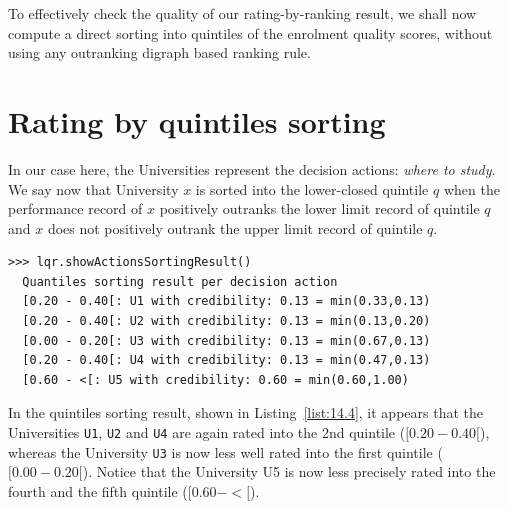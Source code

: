To effectively check the quality of our \NetFlows rating-by-ranking result, we shall now compute a direct sorting into quintiles of the enrolment quality scores, without using any outranking digraph based ranking rule.

\section{Rating by quintiles sorting}
\label{sec:14.4}

In our case here, the Universities represent the decision actions: \emph{where to study}. We say now that University $x$ is sorted into the lower-closed quintile $q$ when the performance record of $x$ positively outranks the lower limit record of quintile $q$ and $x$ does not positively outrank the upper limit record of quintile $q$. 

\begin{lstlisting}[caption={Showing a quantiles sorting result},label=list:14.4,basicstyle=\ttfamily\scriptsize]
>>> lqr.showActionsSortingResult()
  Quantiles sorting result per decision action
  [0.20 - 0.40[: U1 with credibility: 0.13 = min(0.33,0.13)
  [0.20 - 0.40[: U2 with credibility: 0.13 = min(0.13,0.20)
  [0.00 - 0.20[: U3 with credibility: 0.13 = min(0.67,0.13)
  [0.20 - 0.40[: U4 with credibility: 0.13 = min(0.47,0.13)
  [0.60 - <[: U5 with credibility: 0.60 = min(0.60,1.00)
\end{lstlisting}

In the quintiles sorting result, shown in Listing~\vref{list:14.4}, it appears that the Universities \texttt{U1}, \texttt{U2} and \texttt{U4} are again rated into the 2nd quintile ($[0.20 - 0.40[$), whereas the University \texttt{U3} is now less well rated into the first quintile ($[0.00 - 0.20[$). Notice that the University U5 is now less precisely rated into the fourth and the fifth quintile ($[0.60 - <[$).

